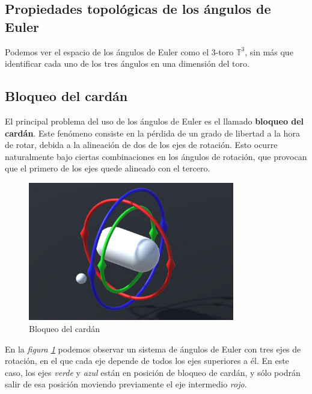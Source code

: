 \documentclass{article}
\theoremstyle{plain}
\theoremstyle{definition}
\theoremstyle{remark}
\begin{document}
\subsection{Propiedades topológicas de los ángulos de Euler}

Podemos ver el espacio de los ángulos de Euler como el 3-toro
$\mathbb T^3$, sin más que identificar cada uno de los tres ángulos
en una dimensión del toro.


\subsection{Bloqueo del cardán}

El principal problema del uso de los ángulos de Euler es el llamado
\textbf{bloqueo del cardán}. Este fenómeno consiste en la pérdida de
un grado de libertad a la hora de rotar, debida a la alineación de dos
de los ejes de rotación. Esto ocurre naturalmente bajo ciertas
combinaciones en los ángulos de rotación, que provocan que el primero
de los ejes quede alineado con el tercero.

\begin{figure}[ht!]
\centering
\includegraphics[width=90mm]{cardan.jpg}
\caption{Bloqueo del cardán \label{figcardan}}
\end{figure}

En la \textit{figura \ref{figcardan}} podemos observar un sistema de ángulos
de Euler con tres ejes de rotación, en el que cada eje depende de
todos los ejes superiores a él. En este caso, los ejes \textit{verde} y \textit{azul}
están en posición de bloqueo de cardán, y sólo podrán salir de esa
posición moviendo previamente el eje intermedio \textit{rojo}.
\end{document}
